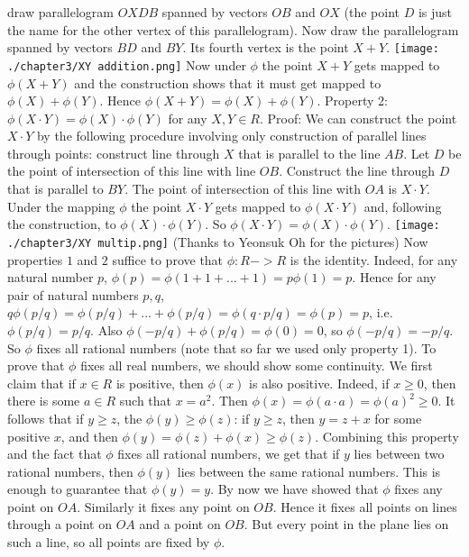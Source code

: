 draw parallelogram $OXDB$ spanned by vectors $OB$ and $OX$ (the point $D$ is just the name for the other vertex of this parallelogram). Now draw the parallelogram spanned by vectors $BD$ and $BY$. Its fourth vertex is the point $X+Y$.
\texttt{[image: ./chapter3/XY addition.png]}
Now under $\phi$ the point $X+Y$ gets mapped to $\phi(X+Y)$ and the construction shows that it must get mapped to $\phi(X)+\phi(Y)$. Hence $\phi(X+Y)=\phi(X)+\phi(Y)$.
Property 2: $\phi(X\cdot Y)=\phi(X)\cdot \phi(Y)$ for any $X,Y\in R$.
Proof: We can construct the point $X\cdot Y$ by the following procedure involving only construction of parallel lines through points: construct line through $X$ that is parallel to the line $AB$. Let $D$ be the point of intersection of this line with line $OB$. Construct the line through $D$ that is parallel to $BY$. The point of intersection of this line with $OA$ is $X\cdot Y$.
Under the mapping $\phi$ the point $X\cdot Y$ gets mapped to $\phi(X\cdot Y)$ and, following the construction, to $\phi(X)\cdot\phi(Y)$. So $\phi(X\cdot Y)=\phi(X)\cdot \phi(Y)$.
\texttt{[image: ./chapter3/XY multip.png]}
(Thanks to Yeonsuk Oh for the pictures)
Now properties $1$ and $2$ suffice to prove that $\phi:R->R$ is the identity. Indeed, for any natural number $p$, $\phi(p)=\phi(1+1+...+1)=p\phi(1)=p$. Hence for any pair of natural numbers $p,q$, $q\phi(p/q)=\phi(p/q)+...+\phi(p/q)=\phi(q\cdot p/q)=\phi(p)=p$, i.e. $\phi(p/q)=p/q$. Also $\phi(-p/q)+\phi(p/q)=\phi(0)=0$, so $\phi(-p/q)=-p/q$. So $\phi$ fixes all rational numbers (note that so far we used only property 1). To prove that $\phi$ fixes all real numbers, we should show some continuity. We first claim that if $x\in R$ is positive, then $\phi(x)$ is also positive. Indeed, if $x\ge 0$, then there is some $a\in R$ such that $x=a^2$. Then $\phi(x)=\phi(a\cdot a)=\phi(a)^2\ge 0$.
It follows that if $y\ge z$, the $\phi(y) \ge \phi(z)$: if $y\ge z$, then $y=z+x$ for some positive $x$, and then $\phi(y)=\phi(z)+\phi(x)\ge \phi(z)$.
Combining this property and the fact that $\phi$ fixes all rational numbers, we get that if $y$ lies between two rational numbers, then $\phi(y)$ lies between the same rational numbers. This is enough to guarantee that $\phi(y)=y$.
By now we have showed that $\phi$ fixes any point on $OA$. Similarly it fixes any point on $OB$. Hence it fixes all points on lines through a point on $OA$ and a point on $OB$. But every point in the plane lies on such a line, so all points are fixed by $\phi$.
